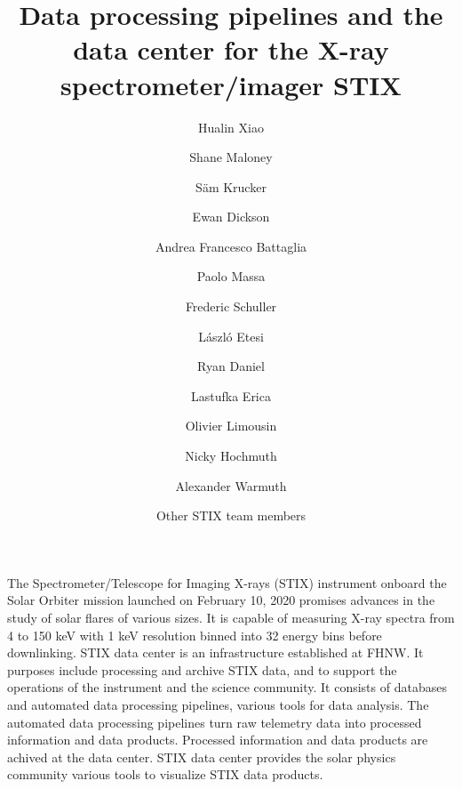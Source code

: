 \documentclass{aa}
\begin{document}
 


   \title{Data processing pipelines and the data center for the X-ray spectrometer/imager STIX}

   \subtitle{}

   \author{Hualin Xiao
          \and 
          Shane Maloney 
          \and S\"am Krucker
          \and Ewan Dickson 
          \and Andrea Francesco Battaglia
          \and Paolo Massa 
          \and Frederic Schuller 
            \and László Etesi 
          \and Ryan Daniel 
          \and Lastufka Erica 
          \and Olivier Limousin 
          \and Nicky Hochmuth 
          \and Alexander Warmuth 
          \and Other STIX team members
         }


   \date{}

 
  \abstract
   {} %
   { The Spectrometer/Telescope for Imaging X-rays (STIX) instrument onboard the Solar Orbiter mission launched on February 10,
    2020 promises advances in the study of solar flares of various sizes. 
    It is capable of measuring X-ray spectra from 4 to 150 keV with 1 keV resolution binned into 
    32 energy bins before downlinking. STIX data center is an infrastructure established at FHNW.
    It purposes include  processing and archive STIX data, and to support 
    the operations of the instrument and the science community.
    It consists of databases and automated data processing pipelines, various tools for data analysis. 
    The automated data processing pipelines turn raw telemetry data into processed information and data products. 
    Processed information and data products are achived at the data center.  
    STIX data center provides the solar physics community various tools to visualize STIX data products.
   }
\end{document}
